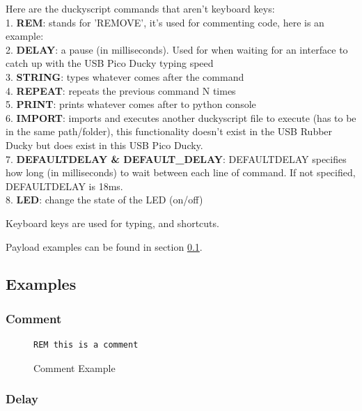 \documentclass[a4paper,12pt]{article}
\begin{document}
Here are the duckyscript commands that aren't keyboard keys:
\\1. \textbf{REM}: stands for 'REMOVE', it's used for commenting code, here is an example:
\\2. \textbf{DELAY}: a pause (in milliseconds). Used for when waiting for an interface to catch up with the USB Pico Ducky typing speed
\\3. \textbf{STRING}: types whatever comes after the command
\\4. \textbf{REPEAT}: repeats the previous command N times
\\5. \textbf{PRINT}: prints whatever comes after to python console
\\6. \textbf{IMPORT}: imports and executes another duckyscript file to execute (has to be in the same path/folder), this functionality doesn't exist in the USB Rubber Ducky but does exist in this USB Pico Ducky.
\\7. \textbf{DEFAULTDELAY \& DEFAULT\_DELAY}:  DEFAULTDELAY specifies how long (in milliseconds) to wait between each line of command. If not specified, DEFAULTDELAY is 18ms.
\\8. \textbf{LED}: change the state of the LED (on/off)

Keyboard keys are used for typing, and shortcuts.

Payload examples can be found in section \ref{duckyscript_examples}.

\subsection{Examples}\label{duckyscript_examples}

\subsubsection{Comment}

\begin{figure}[htb]
\begin{small}
\begin{lstlisting}[language=Ducky]
REM this is a comment
\end{lstlisting}
\end{small}
\caption{Comment Example}
\end{figure}

\subsubsection{Delay}
\end{document}
